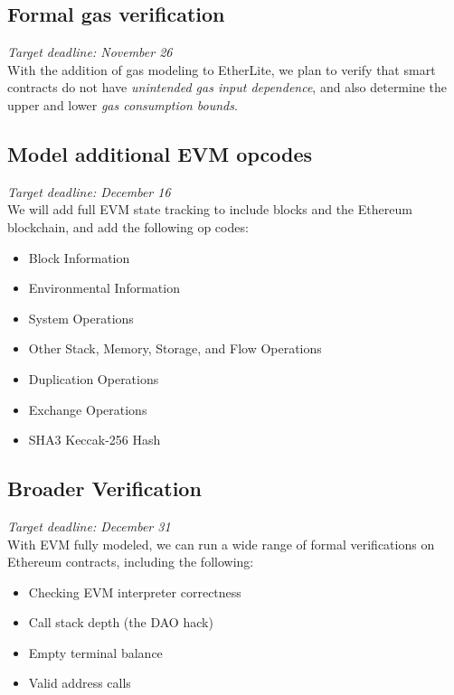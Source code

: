 \subsection{Formal gas verification}
\noindent\emph{Target deadline: November 26}\\[6pt]
With the addition of gas modeling to EtherLite, we plan to verify that smart contracts do not have \textit{unintended gas input dependence}, and also determine the upper and lower \textit{gas consumption bounds}.

\subsection{Model additional EVM opcodes}
\noindent\emph{Target deadline: December 16}\\[6pt]
We will add full EVM state tracking to include blocks and the Ethereum blockchain, and add the following op codes:
\begin{itemize}
	\renewcommand\labelitemi{--}
	\itemsep0.2em
	\item Block Information
	\item Environmental Information
	\item System Operations
	\item Other Stack, Memory, Storage, and Flow Operations
	\item Duplication Operations
	\item Exchange Operations
	\item SHA3 Keccak-256 Hash
\end{itemize}

\subsection{Broader Verification}
\noindent\emph{Target deadline: December 31}\\[6pt]
With EVM fully modeled, we can run a wide range of formal verifications on Ethereum contracts, including the following:
\begin{itemize}
	\renewcommand\labelitemi{--}
	\itemsep0.2em
	\item Checking EVM interpreter correctness
	\item Call stack depth (the DAO hack)
	\item Empty terminal balance 
	\item Valid address calls
\end{itemize}
